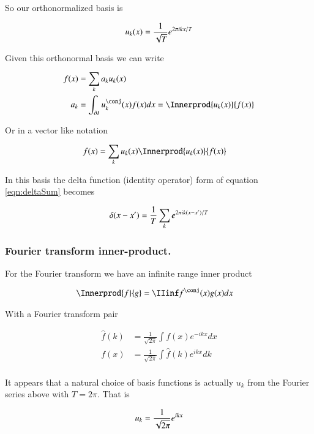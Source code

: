 So our orthonormalized basis is

\begin{align*}
u_k(x) = \frac{1}{\sqrt{T}} e^{ 2 \pi i k x / T}
\end{align*}

Given this orthonormal basis we can write 

\begin{align*}
f(x) 
&= \sum_k a_k u_k(x) \\
a_k &= \int_{\partial I} u_k^\conj(x) f(x) dx = \Innerprod{u_k(x)}{f(x)} \\
\end{align*}

Or in a vector like notation

\begin{align*}
f(x) &= \sum_k u_k(x) \Innerprod{u_k(x)}{f(x)}
\end{align*}

In this basis the 
delta function (identity operator) form of equation \ref{eqn:deltaSum}
becomes

\begin{align*}
\delta(x- x') = \frac{1}{{T}} \sum_k e^{ 2 \pi i k (x-x') / T}
\end{align*}

\subsubsection{Fourier transform inner-product. }

For the Fourier transform we have an infinite range inner product

\begin{align*}
\Innerprod{f}{g} &= \IIinf f^\conj(x) g(x) dx
\end{align*}

With a Fourier transform pair 

\begin{align*}
\hat{f}(k) &= \frac{1}{\sqrt{2\pi}} \int f(x) e^{-i k x} dx \\
{f}(x) &= \frac{1}{\sqrt{2\pi}} \int \hat{f}(k) e^{i k x } dk \\
\end{align*}

It appears that a natural choice of basis functions is actually $u_k$ from the
Fourier series above with $T=2\pi$.  That is

\begin{align*}
u_k = \frac{1}{\sqrt{2\pi}} e^{i k x}
\end{align*}

